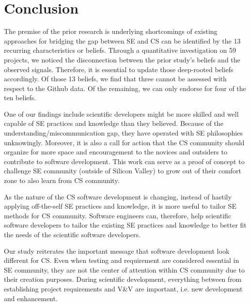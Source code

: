 \documentclass[sigconf,review,anonymous]{acmart}
\begin{document}




\section{Conclusion}

The premise of the prior research \cite{johan18_secs} is underlying shortcomings of existing approaches for bridging the gap between SE and CS can be identified by the 13 recurring characteristics or beliefs. Through a quantitative investigation on 59 projects, we noticed the disconnection between the prior study's beliefs and the observed signals. Therefore, it is essential to update those deep-rooted beliefs accordingly.  Of those 13 beliefs,
we find that three cannot be assessed
with respect to the Github data.
Of the remaining,
we can only endorse for four of the ten beliefs.  


One of our findings include scientific developers might be more skilled and well capable of SE practices and knowledge than they believed. Because of the understanding/miscommunication gap, they have operated with SE philosophies unknowingly. Moreover, it is also a call for action that the CS community should organize for more space and encouragement to the novices and outsiders to contribute to software development. This work can serve as a proof of concept to challenge SE community (outside of Silicon Valley) to grow out of their comfort zone to also learn from CS community.  

As the nature of the CS software development is changing, instead of hastily applying off-the-self SE practices and knowledge, it is more useful to tailor SE methods for CS community. Software engineers can, therefore, help scientific software developers to tailor the existing SE practices and knowledge to better fit the needs of the scientific software developers.

Our study reiterates the important message that software development look different for CS. Even when testing and requirement are considered essential in SE community, they are not the center of attention within CS community due to their creation purposes. During scientific development, everything between from establishing project requirements and V\&V are important, i.e. new development and enhancement. 
\end{document}
